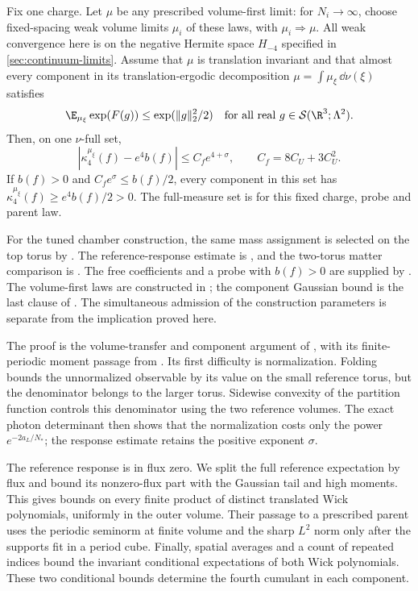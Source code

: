 \begin{theorem}
Fix one charge. Let $\mu$ be any prescribed volume-first limit:
for $N_i\to\infty$, choose fixed-spacing weak volume limits
$\mu_i$ of these laws, with $\mu_i\Rightarrow\mu$.
All weak convergence here is on the negative Hermite space
$H_{-4}$ specified in \cref{sec:continuum-limits}.
Assume that $\mu$ is translation invariant and that almost every
component in its translation-ergodic decomposition
$\mu=\int\mu_\xi\,\dd\nu(\xi)$ satisfies
\begin{equation}\label{eq:vtm-component-G}
 \E_{\mu_\xi}\exp(F(g))\le\exp(\|g\|_2^2/2)
 \quad\text{for all real }g\in\mathcal S(\R^3;\Lambda^2).
\end{equation}
Then, on one $\nu$-full set,
\begin{equation}\label{eq:vtm-main-component}
 |\kappa_4^{\mu_\xi}(f)-e^4b(f)|
                    \le C_fe^{4+\sigma},\qquad C_f=8C_U+3C_U^2.
\end{equation}
If $b(f)>0$ and $C_fe^\sigma\le b(f)/2$, every component
in this set has $\kappa_4^{\mu_\xi}(f)\ge e^4b(f)/2>0$.
The full-measure set is for this fixed charge, probe and parent law.
\end{theorem}

For the tuned chamber construction, the same mass assignment
is selected on the top torus by \cite[Theorem~A]{CommonTuning}.
The reference-response estimate is \cite[Theorem~A]{ReferenceResponse},
and the two-torus matter comparison is \cite[Theorem~A]{TerminalPressure}.
The free coefficients and a probe with $b(f)>0$ are supplied by
\cite[Theorems~A--B]{PositiveProbe}. The volume-first laws are
constructed in \cite{ContinuumExistence}; the component Gaussian
bound is the last clause of \cite[Theorem~A]{ContinuumComponents}.
The simultaneous admission of the construction parameters is
separate from the implication proved here.

The proof is the volume-transfer and component argument of
\cite[\S25--26]{QED3Master}, with its finite-periodic moment
passage from \cite[\S6.1--6.2]{QED3Master}.
Its first difficulty is normalization. Folding bounds the
unnormalized observable by its value on the small reference torus,
but the denominator belongs to the larger torus. Sidewise
convexity of the partition function controls this denominator
using the two reference volumes. The exact photon determinant
then shows that the normalization costs only the power
$e^{-2a_L/N_*}$; the response estimate retains the positive
exponent $\sigma$.

The reference response is in flux zero. We split the full
reference expectation by flux and bound its nonzero-flux part
with the Gaussian tail and high moments. This gives bounds on
every finite product of distinct translated Wick polynomials,
uniformly in the outer volume. Their passage to a prescribed
parent uses the periodic seminorm at finite volume and the sharp
$L^2$ norm only after the supports fit in a period cube.
Finally, spatial averages and a count of repeated indices bound
the invariant conditional expectations of both Wick polynomials.
These two conditional bounds determine the fourth cumulant in
each component.

